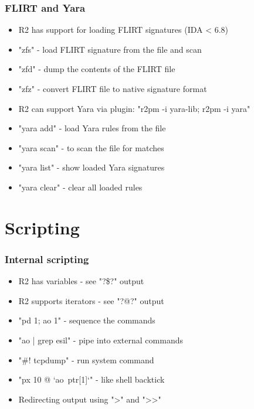 \documentclass[10pt,pdf,utf8,english,compress,hyperref={unicode}]{beamer}
\begin{document}
\begin{frame}[fragile]
  \frametitle{FLIRT and Yara}
  \begin{itemize}
	  \item R2 has support for loading FLIRT signatures (IDA < 6.8)
	  \item "zfs" - load FLIRT signature from the file and scan
	  \item "zfd" - dump the contents of the FLIRT file
	  \item "zfz" - convert FLIRT file to native signature format
	  \item R2 can support Yara via plugin: "r2pm -i yara-lib; r2pm -i yara"
	  \item "yara add" - load Yara rules from the file
	  \item "yara scan" - to scan the file for matches
	  \item "yara list" - show loaded Yara signatures
	  \item "yara clear" - clear all loaded rules
  \end{itemize}
\end{frame}

\section{Scripting}

\begin{frame}[fragile]
  \frametitle{Internal scripting}
  \begin{itemize}
	  \item R2 has variables - see "?\$?" output
	  \item R2 supports iterators - see "?@?" output
	  \item "pd 1; ao 1" - sequence the commands
	  \item "ao | grep esil" - pipe into external commands
	  \item "\#! tcpdump" - run system command
	  \item "px 10 @ `ao~ptr[1]`" - like shell backtick
	  \item Redirecting output using ">" and ">>"
  \end{itemize}
\end{frame}
\end{document}
